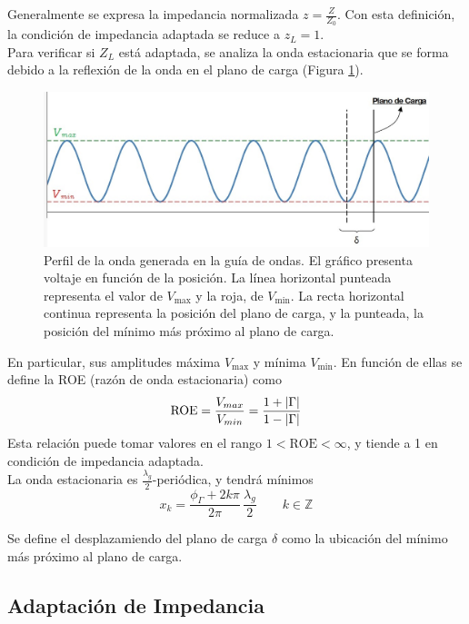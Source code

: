 \documentclass[11pt,a4paper]{article}
\DeclarePairedDelimiter\abs{\lvert}{\rvert}%
\begin{document}
\begin{multicols}{2}
Generalmente se expresa la impedancia normalizada $z=\frac{Z}{Z_0}$. Con esta definición, la condición de impedancia adaptada se reduce a $z_L=1$.\\


Para verificar si $Z_L$ está adaptada, se analiza la onda estacionaria que se forma debido a la reflexión de la onda en el plano de carga (Figura \ref{fig:onda}). 
\begin{figure}[H]
    \centering
    \includegraphics[width=0.9\linewidth]{Images/onda vmax.jpg}
    \caption{Perfil de la onda generada en la guía de ondas. El gráfico presenta voltaje en función de la posición. La línea horizontal punteada representa el valor de $V_\text{max}$ y la roja, de $V_\text{min}$. La recta horizontal continua representa la posición del plano de carga, y la punteada, la posición del mínimo más próximo al plano de carga.}
    \label{fig:onda}
\end{figure}
En particular, sus amplitudes máxima $V_\text{max}$ y mínima $V_\text{min}$. 
En función de ellas se define la ROE (razón de onda estacionaria) como
\begin{equation}\label{eq:roe}
    \text{ROE} = \frac{V_{max}}{V_{min}} = \frac{1+\abs{\Gamma}}{1-\abs{\Gamma}}
\end{equation}
Esta relación puede tomar valores en el rango $1<\text{ROE} < \infty$, y tiende a 1 en condición de impedancia adaptada. \\

La onda estacionaria es $\frac{\lambda_g}{2}$-periódica, y tendrá mínimos 
\begin{equation*}
    x_k = \frac{\phi_\Gamma + 2 k\pi}{2\pi} \, \frac{\lambda_g}{2} \qquad  k\in\mathbb{Z}
\end{equation*}

Se define el desplazamiendo del plano de carga $\delta$ como la ubicación del mínimo más próximo al plano de carga.\\

\subsection{Adaptación de Impedancia}


\end{multicols}
\end{document}
